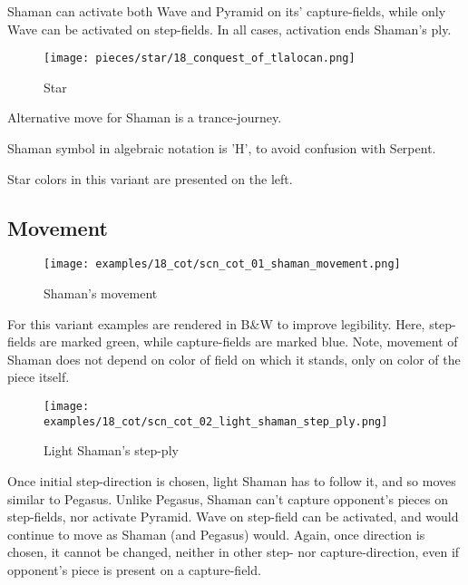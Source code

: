 Shaman can activate both Wave and Pyramid on its' capture-fields, while only
Wave can be activated on step-fields. In all cases, activation ends Shaman's
ply.

\noindent
\begin{wrapfigure}{l}{0.4\textwidth}
\centering
\texttt{[image: pieces/star/18\_conquest\_of\_tlalocan.png]}
\caption{Star}
\label{fig:star/18_conquest_of_tlalocan}
\end{wrapfigure}
Alternative move for Shaman is a trance-journey.

Shaman symbol in algebraic notation is 'H', to avoid confusion with Serpent.

Star colors in this variant are presented on the left.

\clearpage %

\subsection*{Movement}

\noindent
\begin{figure}[!h]
\texttt{[image: examples/18\_cot/scn\_cot\_01\_shaman\_movement.png]}
\caption{Shaman's movement}
\label{fig:scn_cot_01_shaman_movement}
\end{figure}

For this variant examples are rendered in B\&W to improve legibility.
Here, step-fields are marked green, while capture-fields are marked blue.
Note, movement of Shaman does not depend on color of field on which it
stands, only on color of the piece itself.

\clearpage %

\noindent
\begin{figure}[!h]
\texttt{[image: examples/18\_cot/scn\_cot\_02\_light\_shaman\_step\_ply.png]}
\caption{Light Shaman's step-ply}
\label{fig:scn_cot_02_light_shaman_step_ply}
\end{figure}

Once initial step-direction is chosen, light Shaman has to follow it,
and so moves similar to Pegasus. Unlike Pegasus, Shaman can't capture
opponent's pieces on step-fields, nor activate Pyramid. Wave on step-field
can be activated, and would continue to move as Shaman (and Pegasus)
would. Again, once direction is chosen, it cannot be changed, neither
in other step- nor capture-direction, even if opponent's piece is present
on a capture-field.

